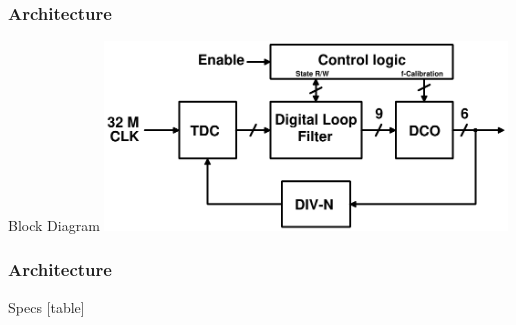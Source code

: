 \documentclass[t, screen, aspectratio=43]{beamer}
\begin{document}
\begin{frame}
  \frametitle{Architecture}
  \begin{block}{Block Diagram}
    \center\includegraphics[width=0.8\textwidth, angle=0]{pll.pdf}
  \end{block}

\end{frame}


\begin{frame}
  \frametitle{Architecture}
  \begin{block}{Specs}
    [table]
  \end{block}

\end{frame}

\end{document}
